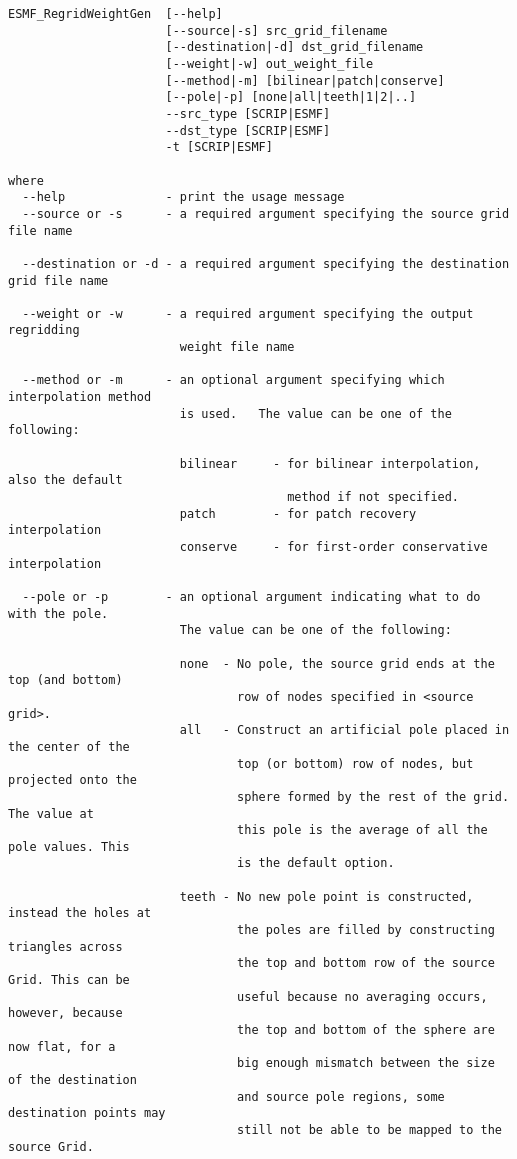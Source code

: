 \begin{verbatim}
ESMF_RegridWeightGen  [--help]
                      [--source|-s] src_grid_filename 
                      [--destination|-d] dst_grid_filename 
                      [--weight|-w] out_weight_file 
                      [--method|-m] [bilinear|patch|conserve] 
                      [--pole|-p] [none|all|teeth|1|2|..] 
                      --src_type [SCRIP|ESMF] 
                      --dst_type [SCRIP|ESMF]
                      -t [SCRIP|ESMF]

where
  --help              - print the usage message 
  --source or -s      - a required argument specifying the source grid file name

  --destination or -d - a required argument specifying the destination grid file name

  --weight or -w      - a required argument specifying the output regridding 
                        weight file name

  --method or -m      - an optional argument specifying which interpolation method
                        is used.   The value can be one of the following:

                        bilinear     - for bilinear interpolation, also the default
                                       method if not specified.
                        patch        - for patch recovery interpolation
                        conserve     - for first-order conservative interpolation

  --pole or -p        - an optional argument indicating what to do with the pole.  
                        The value can be one of the following:

                        none  - No pole, the source grid ends at the top (and bottom) 
                                row of nodes specified in <source grid>.
                        all   - Construct an artificial pole placed in the center of the 
                                top (or bottom) row of nodes, but projected onto the 
                                sphere formed by the rest of the grid. The value at 
                                this pole is the average of all the pole values. This
                                is the default option.

                        teeth - No new pole point is constructed, instead the holes at 
                                the poles are filled by constructing triangles across 
                                the top and bottom row of the source Grid. This can be
                                useful because no averaging occurs, however, because 
                                the top and bottom of the sphere are now flat, for a
                                big enough mismatch between the size of the destination
                                and source pole regions, some destination points may
                                still not be able to be mapped to the source Grid. 


\end{verbatim}

